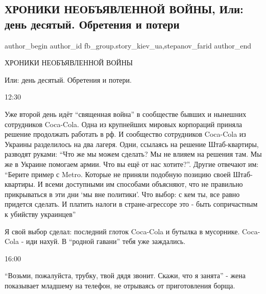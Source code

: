  
 
 
 
 
 
\subsection{ХРОНИКИ НЕОБЪЯВЛЕННОЙ ВОЙНЫ, Или: день десятый. Обретения и потери}
\label{sec:09_03_2022.fb.fb_group.story_kiev_ua.1.hroniki_obretenia_i_poteri}
 
\ifcmt
 author_begin
   author_id fb_group.story_kiev_ua,stepanov_farid
 author_end
\fi

ХРОНИКИ НЕОБЪЯВЛЕННОЙ ВОЙНЫ

Или: день десятый. Обретения и потери.

12:30

Уже второй день идёт \enquote{священная война} в сообществе бывших и нынешних
сотрудников Coca-Cola. Одна из крупнейших мировых корпораций приняла решение
продолжать работать в рф. И сообщество сотрудников Coca-Cola из Украины
разделилось на два лагеря. Одни, ссылаясь на решение Штаб-квартиры, разводят
руками: \enquote{Что же мы можем сделать? Мы не влияем на решения там. Мы же в
Украине помогаем армии. Что вы ещё от нас хотите?}. Другие отвечают им:
\enquote{Берите пример с Metro. Которые не приняли подобную позицию своей
Штаб-квартиры. И всеми доступными им способами объясняют, что не правильно
прикрываться в эти дни \enquote{мы вне политики}. Что выбор: с кем ты, все
равно придется сделать. И платить налоги в стране-агрессоре это - быть
сопричастным к убийству украинцев}

Я свой выбор сделал: последний глоток Coca-Cola и бутылка в мусорнике.
Coca-Cola - иди нахуй. В \enquote{родной гавани} тебя уже заждались.

16:00

\enquote{Возьми, пожалуйста, трубку, твой дядя звонит. Скажи, что я занята} - жена
показывает младшему на телефон, не отрываясь от приготовления борща.

